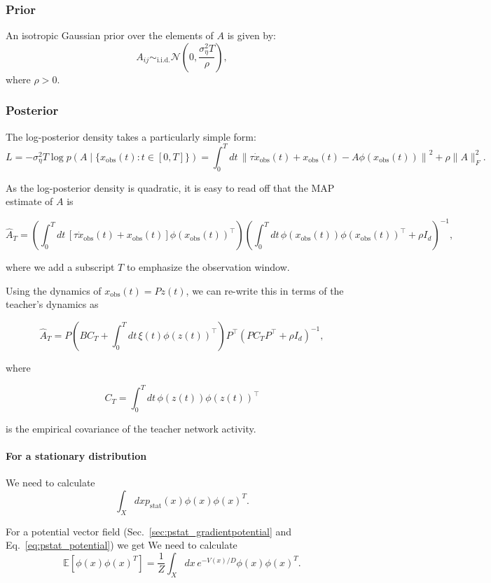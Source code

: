\documentclass{article}
\theoremstyle{definition} \newtheorem{definition}{Definition}
\theoremstyle{remark} \newtheorem{remark}{Remark}
\newcounter{ct}
\begin{document}
\subsubsection{Prior}
An isotropic Gaussian prior over the elements of \( A \) is given by:  
\[
A_{ij} \sim_{\text{i.i.d.}} \mathcal{N} \left( 0, \frac{\sigma^2_{\eta} T}{\rho} \right),
\]
where \( \rho > 0 \).


\subsubsection{Posterior}
The log-posterior density takes a particularly simple form:
\[
L = -\sigma^2_{\eta} T \log p\left(A \mid \{x_{\text{obs}}(t) : t \in [0, T]\} \right) = \int_{0}^{T} dt \, \left\| \tau \dot{x}_{\text{obs}}(t) + x_{\text{obs}}(t) - A \phi(x_{\text{obs}}(t)) \right\|^2 + \rho \|A\|^2_F.
\]



As the log-posterior density is quadratic, it is easy to read off that the MAP estimate of \( A \) is 

\[
\hat{A}_T = \left( \int_{0}^{T} dt \, \left[ \tau \dot{x}_{\text{obs}}(t) + x_{\text{obs}}(t) \right] \phi(x_{\text{obs}}(t))^\top \right) 
\left( \int_{0}^{T} dt \, \phi(x_{\text{obs}}(t)) \phi(x_{\text{obs}}(t))^\top + \rho I_d \right)^{-1},
\]

where we add a subscript \( T \) to emphasize the observation window. 

Using the dynamics of \( x_{\text{obs}}(t) = P z(t) \), we can re-write this in terms of the teacher’s dynamics as

\[
\hat{A}_T = P \left( B C_T + \int_{0}^{T} dt \, \xi(t) \phi(z(t))^\top \right) P^\top 
\left( P C_T P^\top + \rho I_d \right)^{-1},
\]

where

\[
C_T = \int_{0}^{T} dt \, \phi(z(t)) \phi(z(t))^\top
\]

is the empirical covariance of the teacher network activity.

\paragraph{For a stationary distribution}
We need to calculate 
\begin{equation}
\int_X dx p_{\text{stat}}(x) \phi(x)\phi(x)^T.
\end{equation}

For a potential vector field (Sec.~\ref{sec:pstat_gradientpotential} and Eq.~\ref{eq:pstat_potential}) we get 
We need to calculate 
\[
\mathbb{E}[\phi(x) \phi(x)^T] = \frac{1}{Z} \int_{X} dx \, e^{-V(x)/D} \phi(x) \phi(x)^T.
\]
\end{document}
